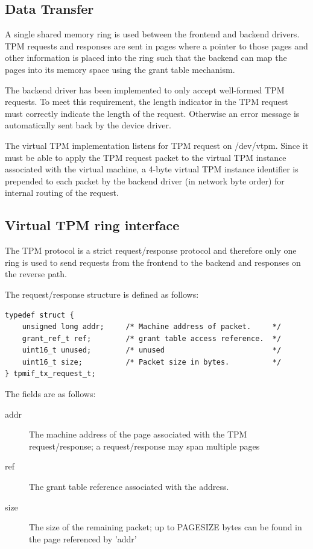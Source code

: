 \documentclass[11pt,twoside,final,openright]{report}
\begin{document}
\subsection{Data Transfer}

A single shared memory ring is used between the frontend and backend
drivers. TPM requests and responses are sent in pages where a pointer
to those pages and other information is placed into the ring such that
the backend can map the pages into its memory space using the grant
table mechanism.

The backend driver has been implemented to only accept well-formed
TPM requests. To meet this requirement, the length indicator in the
TPM request must correctly indicate the length of the request.
Otherwise an error message is automatically sent back by the device driver.

The virtual TPM implementation listens for TPM request on /dev/vtpm. Since
it must be able to apply the TPM request packet to the virtual TPM instance
associated with the virtual machine, a 4-byte virtual TPM instance
identifier is prepended to each packet by the backend driver (in network
byte order) for internal routing of the request.

\subsection{Virtual TPM ring interface}

The TPM protocol is a strict request/response protocol and therefore
only one ring is used to send requests from the frontend to the backend
and responses on the reverse path.

The request/response structure is defined as follows:

\scriptsize
\begin{verbatim}
typedef struct {
    unsigned long addr;     /* Machine address of packet.     */
    grant_ref_t ref;        /* grant table access reference.  */
    uint16_t unused;        /* unused                         */
    uint16_t size;          /* Packet size in bytes.          */
} tpmif_tx_request_t;
\end{verbatim}
\normalsize

The fields are as follows:

\begin{description}
\item[addr] The machine address of the page associated with the TPM
            request/response; a request/response may span multiple
            pages
\item[ref]  The grant table reference associated with the address.
\item[size] The size of the remaining packet; up to
            PAGE{\textunderscore}SIZE bytes can be found in the
            page referenced by 'addr'
\end{description}
\end{document}
